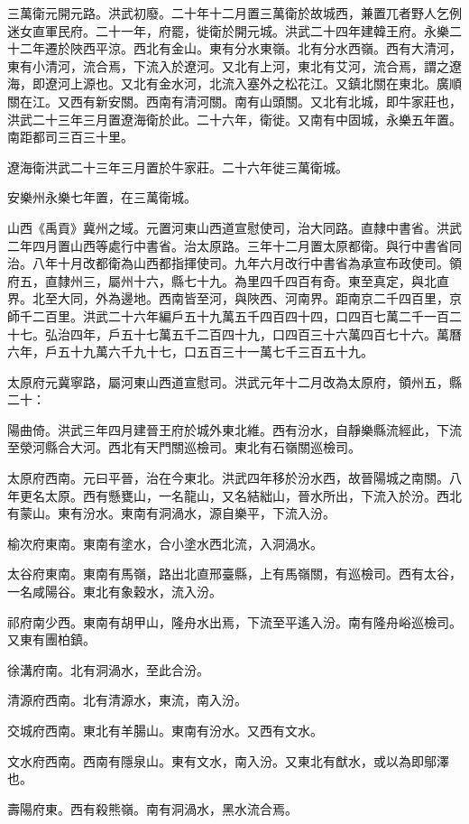 三萬衛元開元路。洪武初廢。二十年十二月置三萬衛於故城西，兼置兀者野人乞例迷女直軍民府。二十一年，府罷，徙衛於開元城。洪武二十四年建韓王府。永樂二十二年遷於陜西平涼。西北有金山。東有分水東嶺。北有分水西嶺。西有大清河，東有小清河，流合焉，下流入於遼河。又北有上河，東北有艾河，流合焉，謂之遼海，即遼河上源也。又北有金水河，北流入塞外之松花江。又鎮北關在東北。廣順關在江。又西有新安關。西南有清河關。南有山頭關。又北有北城，即牛家莊也，洪武二十三年三月置遼海衛於此。二十六年，衛徙。又南有中固城，永樂五年置。南距都司三百三十里。

遼海衛洪武二十三年三月置於牛家莊。二十六年徙三萬衛城。

安樂州永樂七年置，在三萬衛城。

山西《禹貢》冀州之域。元置河東山西道宣慰使司，治大同路。直隸中書省。洪武二年四月置山西等處行中書省。治太原路。三年十二月置太原都衛。與行中書省同治。八年十月改都衛為山西都指揮使司。九年六月改行中書省為承宣布政使司。領府五，直隸州三，屬州十六，縣七十九。為里四千四百有奇。東至真定，與北直界。北至大同，外為邊地。西南皆至河，與陜西、河南界。距南京二千四百里，京師千二百里。洪武二十六年編戶五十九萬五千四百四十四，口四百七萬二千一百二十七。弘治四年，戶五十七萬五千二百四十九，口四百三十六萬四百七十六。萬曆六年，戶五十九萬六千九十七，口五百三十一萬七千三百五十九。

太原府元冀寧路，屬河東山西道宣慰司。洪武元年十二月改為太原府，領州五，縣二十：

陽曲倚。洪武三年四月建晉王府於城外東北維。西有汾水，自靜樂縣流經此，下流至滎河縣合大河。西北有天門關巡檢司。東北有石嶺關巡檢司。

太原府西南。元曰平晉，治在今東北。洪武四年移於汾水西，故晉陽城之南關。八年更名太原。西有懸甕山，一名龍山，又名結絀山，晉水所出，下流入於汾。西北有蒙山。東有汾水。東南有洞渦水，源自樂平，下流入汾。

榆次府東南。東南有塗水，合小塗水西北流，入洞渦水。

太谷府東南。東南有馬嶺，路出北直邢臺縣，上有馬嶺關，有巡檢司。西有太谷，一名咸陽谷。東北有象穀水，流入汾。

祁府南少西。東南有胡甲山，隆舟水出焉，下流至平遙入汾。南有隆舟峪巡檢司。又東有團柏鎮。

徐溝府南。北有洞渦水，至此合汾。

清源府西南。北有清源水，東流，南入汾。

交城府西南。東北有羊腸山。東南有汾水。又西有文水。

文水府西南。西南有隱泉山。東有文水，南入汾。又東北有猷水，或以為即鄔澤也。

壽陽府東。西有殺熊嶺。南有洞渦水，黑水流合焉。

